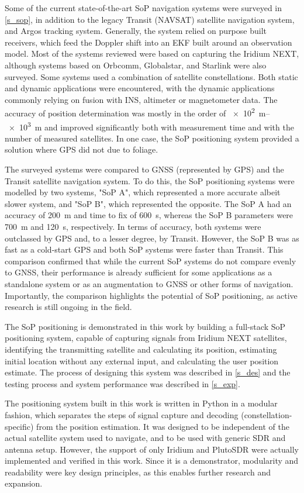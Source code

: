 Some of the current state-of-the-art SoP navigation systems were surveyed in \autoref{s_sop}, in addition to the legacy Transit (NAVSAT) satellite navigation system, and Argos tracking system. Generally, the system relied on purpose built receivers, which feed the Doppler shift into an EKF built around an observation model. Most of the systems reviewed were based on capturing the Iridium NEXT, although systems based on Orbcomm, Globalstar, and Starlink were also surveyed. Some systems used a combination of satellite constellations. Both static and dynamic applications were encountered, with the dynamic applications commonly relying on fusion with INS, altimeter or magnetometer data. The accuracy of position determination was mostly in the order of \qtyrange{e2}{e3}{\m} and improved significantly both with measurement time and with the number of measured satellites. In one case, the SoP positioning system provided a solution where GPS did not due to foliage. 

The surveyed systems were compared to GNSS (represented by GPS) and the Transit satellite navigation system. To do this, the SoP positioning systems were modelled by two systems, "SoP A", which represented a more accurate albeit slower system, and "SoP B", which represented the opposite. The SoP A had an accuracy of \qty{200}{m} and time to fix of \qty{600}{s}, whereas the SoP B parameters were \qty{700}{m} and \qty{120}{s}, respectively. In terms of accuracy, both systems were outclassed by GPS and, to a lesser degree, by Transit. However, the SoP B was as fast as a cold-start GPS and both SoP systems were faster than Transit. This comparison confirmed that while the current SoP systems do not compare evenly to GNSS, their performance is already sufficient for some applications as a standalone system or as an augmentation to GNSS or other forms of navigation. Importantly, the comparison highlights the potential of SoP positioning, as active research is still ongoing in the field.

The SoP positioning is demonstrated in this work by building a full-stack SoP positioning system, capable of capturing signals from Iridium NEXT satellites, identifying the transmitting satellite and calculating its position, estimating initial location without any external input, and calculating the user position estimate. The process of designing this system was described in \autoref{s_des} and the testing process and system performance was described in \autoref{s_exp}.

The positioning system built in this work is written in Python in a modular fashion, which separates the steps of signal capture and decoding (constellation-specific) from the position estimation. It was designed to be independent of the actual satellite system used to navigate, and to be used with generic SDR and antenna setup. However, the support of only Iridium and PlutoSDR were actually implemented and verified in this work. Since it is a demonstrator, modularity and readability were key design principles, as this enables further research and expansion. 

